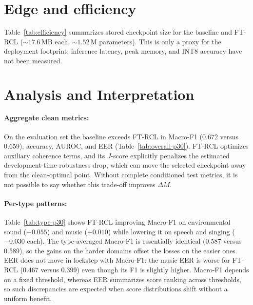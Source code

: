 
\section{Edge and efficiency}
\label{sec:efficiency}

Table~\ref{tab:efficiency} summarizes stored checkpoint size for the baseline and FT-RCL (${\sim}17.6$\,MB each, ${\sim}1.52$\,M parameters). This is only a proxy for the deployment footprint; inference latency, peak memory, and INT8 accuracy have not been measured.



\section{Analysis and Interpretation}

\paragraph{Aggregate clean metrics:} On the evaluation set the baseline exceeds FT-RCL in Macro-F1 (0.672 versus 0.659), accuracy, AUROC, and EER (Table~\ref{tab:overall-p30}). FT-RCL optimizes auxiliary coherence terms, and its $J$-score explicitly penalizes the estimated development-time robustness drop, which can move the selected checkpoint away from the clean-optimal point. Without complete conditioned test metrics, it is not possible to say whether this trade-off improves $\Delta M$.

\paragraph{Per-type patterns:} Table~\ref{tab:type-p30} shows FT-RCL improving Macro-F1 on environmental sound ($+0.055$) and music ($+0.010$) while lowering it on speech and singing ($-0.030$ each). The type-averaged Macro-F1 is essentially identical (0.587 versus 0.589), so the gains on the harder domains offset the losses on the easier ones. EER does not move in lockstep with Macro-F1: the music EER is worse for FT-RCL (0.467 versus 0.399) even though its F1 is slightly higher. Macro-F1 depends on a fixed threshold, whereas EER summarizes score ranking across thresholds, so such discrepancies are expected when score distributions shift without a uniform benefit.

